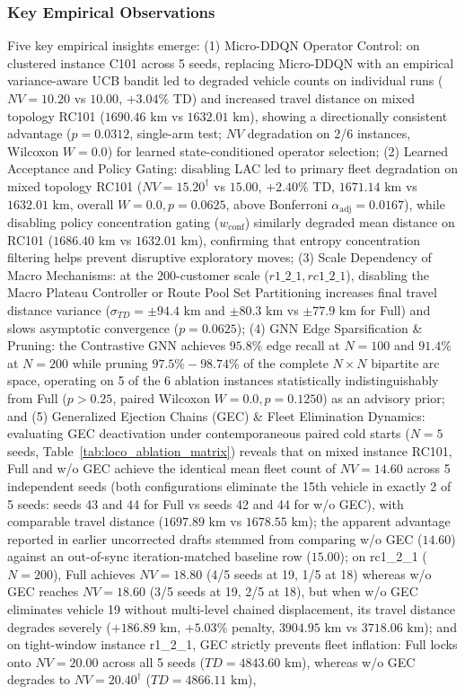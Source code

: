 \documentclass{ieeeaccess}
\begin{document}
\subsubsection{Key Empirical Observations}
Five key empirical insights emerge: (1) Micro-DDQN Operator Control: on clustered instance C101 across 5 seeds, replacing Micro-DDQN with an empirical variance-aware UCB bandit led to degraded vehicle counts on individual runs ($NV=10.20$ vs $10.00$, $+3.04\%$ TD) and increased travel distance on mixed topology RC101 ($1690.46\text{ km}$ vs $1632.01\text{ km}$), showing a directionally consistent advantage ($p=0.0312$, single-arm test; $NV$ degradation on 2/6 instances, Wilcoxon $W=0.0$) for learned state-conditioned operator selection; (2) Learned Acceptance and Policy Gating: disabling LAC led to primary fleet degradation on mixed topology RC101 ($NV=15.20^\dagger$ vs $15.00$, $+2.40\%$ TD, $1671.14\text{ km}$ vs $1632.01\text{ km}$, overall $W=0.0, p=0.0625$, above Bonferroni $\alpha_{\text{adj}}=0.0167$), while disabling policy concentration gating ($w_{\text{conf}}$) similarly degraded mean distance on RC101 ($1686.40\text{ km}$ vs $1632.01\text{ km}$), confirming that entropy concentration filtering helps prevent disruptive exploratory moves; (3) Scale Dependency of Macro Mechanisms: at the 200-customer scale ($r1\_2\_1, rc1\_2\_1$), disabling the Macro Plateau Controller or Route Pool Set Partitioning increases final travel distance variance ($\sigma_{TD} = \pm 94.4\text{ km}$ and $\pm 80.3\text{ km}$ vs $\pm 77.9\text{ km}$ for Full) and slows asymptotic convergence ($p=0.0625$); (4) GNN Edge Sparsification \& Pruning: the Contrastive GNN achieves $95.8\%$ edge recall at $N=100$ and $91.4\%$ at $N=200$ while pruning $97.5\%-98.74\%$ of the complete $N \times N$ bipartite arc space, operating on 5 of the 6 ablation instances statistically indistinguishably from Full ($p > 0.25$, paired Wilcoxon $W=0.0, p=0.1250$) as an advisory prior; and (5) Generalized Ejection Chains (GEC) \& Fleet Elimination Dynamics: evaluating GEC deactivation under contemporaneous paired cold starts ($N=5$ seeds, Table~\ref{tab:loco_ablation_matrix}) reveals that on mixed instance RC101, \textsf{Full} and \textsf{w/o GEC} achieve the identical mean fleet count of $NV=14.60$ across 5 independent seeds (both configurations eliminate the 15th vehicle in exactly 2 of 5 seeds: seeds 43 and 44 for Full vs seeds 42 and 44 for w/o GEC), with comparable travel distance ($1697.89\text{ km}$ vs $1678.55\text{ km}$); the apparent advantage reported in earlier uncorrected drafts stemmed from comparing w/o GEC ($14.60$) against an out-of-sync iteration-matched baseline row ($15.00$); on rc1\_2\_1 ($N=200$), \textsf{Full} achieves $NV=18.80$ (4/5 seeds at 19, 1/5 at 18) whereas \textsf{w/o GEC} reaches $NV=18.60$ (3/5 seeds at 19, 2/5 at 18), but when \textsf{w/o GEC} eliminates vehicle 19 without multi-level chained displacement, its travel distance degrades severely ($+186.89\text{ km}$, $+5.03\%$ penalty, $3904.95\text{ km}$ vs $3718.06\text{ km}$); and on tight-window instance r1\_2\_1, GEC strictly prevents fleet inflation: \textsf{Full} locks onto $NV=20.00$ across all 5 seeds ($TD=4843.60\text{ km}$), whereas \textsf{w/o GEC} degrades to $NV=20.40^\dagger$ ($TD=4866.11\text{ km}$), 
\end{document}
